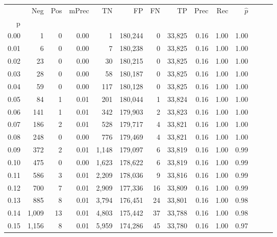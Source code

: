 \begin{tabular}{rrrrrrrrrrrrrr}
\toprule
{} &    Neg &  Pos & mPrec &       TN &       FP &      FN &      TP &  Prec &   Rec & $\hat{p}$ \\
p    &        &      &       &          &          &         &         &       &       &           \\
\midrule
0.00 &      1 &    0 &  0.00 &        1 &  180,244 &       0 &  33,825 &  0.16 &  1.00 &      1.00 \\
0.01 &      6 &    0 &  0.00 &        7 &  180,238 &       0 &  33,825 &  0.16 &  1.00 &      1.00 \\
0.02 &     23 &    0 &  0.00 &       30 &  180,215 &       0 &  33,825 &  0.16 &  1.00 &      1.00 \\
0.03 &     28 &    0 &  0.00 &       58 &  180,187 &       0 &  33,825 &  0.16 &  1.00 &      1.00 \\
0.04 &     59 &    0 &  0.00 &      117 &  180,128 &       0 &  33,825 &  0.16 &  1.00 &      1.00 \\
0.05 &     84 &    1 &  0.01 &      201 &  180,044 &       1 &  33,824 &  0.16 &  1.00 &      1.00 \\
0.06 &    141 &    1 &  0.01 &      342 &  179,903 &       2 &  33,823 &  0.16 &  1.00 &      1.00 \\
0.07 &    186 &    2 &  0.01 &      528 &  179,717 &       4 &  33,821 &  0.16 &  1.00 &      1.00 \\
0.08 &    248 &    0 &  0.00 &      776 &  179,469 &       4 &  33,821 &  0.16 &  1.00 &      1.00 \\
0.09 &    372 &    2 &  0.01 &    1,148 &  179,097 &       6 &  33,819 &  0.16 &  1.00 &      0.99 \\
0.10 &    475 &    0 &  0.00 &    1,623 &  178,622 &       6 &  33,819 &  0.16 &  1.00 &      0.99 \\
0.11 &    586 &    3 &  0.01 &    2,209 &  178,036 &       9 &  33,816 &  0.16 &  1.00 &      0.99 \\
0.12 &    700 &    7 &  0.01 &    2,909 &  177,336 &      16 &  33,809 &  0.16 &  1.00 &      0.99 \\
0.13 &    885 &    8 &  0.01 &    3,794 &  176,451 &      24 &  33,801 &  0.16 &  1.00 &      0.98 \\
0.14 &  1,009 &   13 &  0.01 &    4,803 &  175,442 &      37 &  33,788 &  0.16 &  1.00 &      0.98 \\
0.15 &  1,156 &    8 &  0.01 &    5,959 &  174,286 &      45 &  33,780 &  0.16 &  1.00 &      0.97 \\

\end{tabular}
